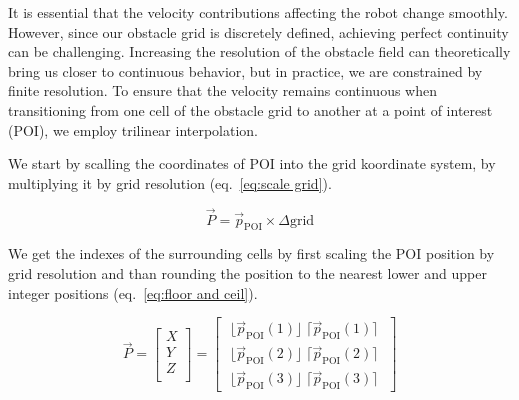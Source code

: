 \documentclass[]{article}
\begin{document}
It is essential that the velocity contributions affecting the robot change smoothly. However, since our obstacle grid is discretely defined, achieving perfect continuity can be challenging. Increasing the resolution of the obstacle field can theoretically bring us closer to continuous behavior, but in practice, we are constrained by finite resolution. To ensure that the velocity remains continuous when transitioning from one cell of the obstacle grid to another at a point of interest (POI), we employ trilinear interpolation. 

We start by scalling the coordinates of POI into the grid koordinate system, by multiplying it by grid resolution (eq.~\ref{eq:scale grid}). 

\begin{equation}
	\label{eq:scale grid}
	\vec{P} = \vec{p}_{\mathrm{POI}} \times\Delta \mathrm{grid}
\end{equation}

We get the indexes of the surrounding cells by first scaling the POI position by grid resolution and than rounding the position to the nearest lower and upper integer positions (eq.~\ref{eq:floor and ceil}).

%
%
	
	\begin{equation}
		\label{eq:floor and ceil}
		\vec{P} =
		\begin{bmatrix}
			X \\
			Y \\
			Z \\
		\end{bmatrix}
		=
		\begin{bmatrix}
			\; \lfloor \vec{p}_{\mathrm{POI}}(1) \rfloor \; \lceil \vec{p}_{\mathrm{POI}}(1) \rceil \;  \\
			\; \lfloor \vec{p}_{\mathrm{POI}}(2) \rfloor \; \lceil \vec{p}_{\mathrm{POI}}(2) \rceil \; \\
			\; \lfloor \vec{p}_{\mathrm{POI}}(3) \rfloor \; \lceil \vec{p}_{\mathrm{POI}}(3) \rceil \; 
		\end{bmatrix}
	\end{equation}
\end{document}
